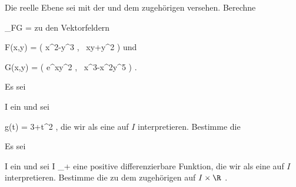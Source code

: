 \setcounter{section}{26}


{}
{

Die reelle Ebene sei mit der
und dem zugehörigen
versehen. Berechne

\mavergleichskette
{\vergleichskette
{ \nabla_FG
}
{ = }{
}
{  }{
}
{    }{
}
{   }{
}
}
{}{}{}
zu den Vektorfeldern

\mavergleichskettedisp
{\vergleichskette
{ F(x,y)
}
{ =} { \left(  x^2-y^3  , \,   xy+y^2                   \right)
}
{ } {
}
{ } {
}
{ } {
}
}
{}{}{}
und

\mavergleichskettedisp
{\vergleichskette
{ G(x,y)
}
{ =} { \left( e^{xy^2}   , \,   x^3-x^2y^5                   \right)
}
{ } {
}
{ } {
}
{ } {
}
}
{}{}{.}

}
{} {}

{}
{

Es sei

\mavergleichskette
{\vergleichskette
{ I
}
{ \subseteq }{ \R
}
{  }{
}
{    }{
}
{   }{
}
}
{}{}{}
ein
und sei

\mavergleichskettedisp
{\vergleichskette
{ g(t)
}
{ =} { 3+t^2
}
{ } {
}
{ } {
}
{ } {
}
}
{}{}{,}
die wir als eine
auf $I$ interpretieren. Bestimme die
 {} {}


}
{} {}

{}
{

Es sei

\mavergleichskette
{\vergleichskette
{ I
}
{ \subseteq }{ \R
}
{  }{
}
{    }{
}
{   }{
}
}
{}{}{}
ein
und sei
 { I } {\R_+
} {}
eine positive differenzierbare Funktion, die wir als eine
auf $I$ interpretieren. Bestimme die
zu dem zugehörigen
auf $I \times \R$
 {} {.}

}
{} {}

